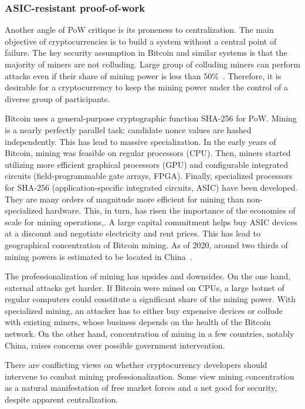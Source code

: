\subsubsection*{ASIC-resistant proof-of-work}

Another angle of PoW critique is its proneness to centralization.
The main objective of cryptocurrencies is to build a system without a central point of failure.
The key security assumption in Bitcoin and similar systems is that the majority of miners are not colluding.
Large group of colluding miners can perform attacks even if their share of mining power is less than $50\%$~\cite{Eyal2018}.
Therefore, it is desirable for a cryptocurrency to keep the mining power under the control of a diverse group of participants.

Bitcoin uses a general-purpose cryptographic function SHA-256 for PoW.
Mining is a nearly perfectly parallel task: candidate nonce values are hashed independently.
This has lead to massive specialization.
In the early years of Bitcoin, mining was feasible on regular processors (CPU).
Then, miners started utilizing more efficient graphical processors (GPU) and configurable integrated circuits (field-programmable gate arrays, FPGA).
Finally, specialized processors for SHA-256 (application-specific integrated circuits, ASIC) have been developed.
They are many orders of magnitude more efficient for mining than non-specialized hardware.
This, in turn, has risen the importance of the economies of scale for mining operations,.
A large capital commitment helps buy ASIC devices at a discount and negotiate electricity and rent prices.
This has lead to geographical concentration of Bitcoin mining.
As of 2020, around two thirds of mining powers is estimated to be located in China~\cite{Rauchs2020}.

The professionalization of mining has upsides and downsides.
On the one hand, external attacks get harder.
If Bitcoin were mined on CPUs, a large botnet of regular computers could constitute a significant share of the mining power.
With specialized mining, an attacker has to either buy expensive devices or collude with existing miners, whose business depends on the health of the Bitcoin network.
On the other hand, concentration of mining in a few countries, notably China, raises concerns over possible government intervention.

There are conflicting views on whether cryptocurrency developers should intervene to combat mining professionalization.
Some view mining concentration as a natural manifestation of free market forces and a net good for security, despite apparent centralization.

